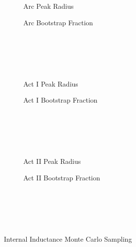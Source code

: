 \begin{figure*}
    \centering
    \hfill 
    \begin{subfigure}[t]{0.45\textwidth}
        \centering
		\begin{adjustbox}{width=\textwidth}
			\Large
			
		\end{adjustbox}
        \caption{Arc Peak Radius}
    \end{subfigure}
    \hfill
    \begin{subfigure}[t]{0.45\textwidth}
        \centering
		\begin{adjustbox}{width=\textwidth}
			\Large
			
		\end{adjustbox}
        \caption{Arc Bootstrap Fraction}
    \end{subfigure}
    \hfill \hfill ~\\ ~\\ ~\\ ~\\
    \hfill 
    \begin{subfigure}[t]{0.45\textwidth}
        \centering
		\begin{adjustbox}{width=\textwidth}
			\Large
			
		\end{adjustbox}
        \caption{Act I Peak Radius}
    \end{subfigure}
    \hfill
    \begin{subfigure}[t]{0.45\textwidth}
        \centering
		\begin{adjustbox}{width=\textwidth}
			\Large
			
		\end{adjustbox}
        \caption{Act I Bootstrap Fraction}
    \end{subfigure}
    \hfill \hfill ~\\ ~\\ ~\\ ~\\
    \hfill 
    \begin{subfigure}[t]{0.45\textwidth}
        \centering
		\begin{adjustbox}{width=\textwidth}
			\Large
			
		\end{adjustbox}
        \caption{Act II Peak Radius}
    \end{subfigure}
    \hfill
    \begin{subfigure}[t]{0.45\textwidth}
        \centering
		\begin{adjustbox}{width=\textwidth}
			\Large
			
		\end{adjustbox}
        \caption{Act II Bootstrap Fraction}
    \end{subfigure}
    \hfill \hfill ~\\ ~\\ ~\\ ~\\
    \caption{Internal Inductance Monte Carlo Sampling}
    \label{fig:inductance_samplings}
\end{figure*}


